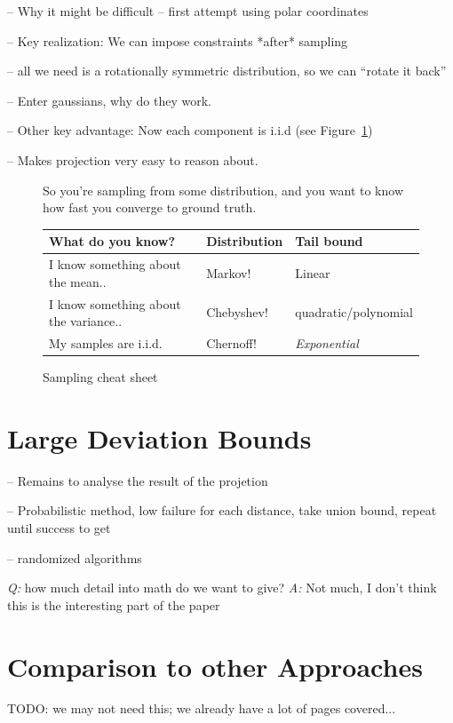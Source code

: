 \documentclass[11pt]{article}
\begin{document}
-- Why it might be difficult
-- first attempt using polar coordinates

-- Key realization: We can impose constraints *after* sampling

   -- all we need is a rotationally symmetric distribution, so we can ``rotate
   it back''

-- Enter gaussians, why do they work.

-- Other key advantage: Now each component is i.i.d (see Figure~\ref{fig:bounds})

    -- Makes projection very easy to reason about.

    \begin{figure}[H]
      So you're sampling from some distribution, and you want to know how fast
      you converge to ground truth.

      \begin{tabular}{lll}
        What do you know? & Distribution & Tail bound\\
        \hline
        I know something about the mean..  & Markov! & Linear \\
        I know something about the variance..  & Chebyshev! & quadratic/polynomial\\
        My samples are i.i.d.  & Chernoff! & \emph{Exponential}\\
        \hline
      \end{tabular}
      \caption{Sampling cheat sheet}
      \label{fig:bounds}
    \end{figure}

\section{Large Deviation Bounds}

-- Remains to analyse the result of the projetion

-- Probabilistic method, low failure for each distance, take union bound, repeat
until success to get

-- randomized algorithms

\emph{Q:} how much detail into math do we want to give?
\emph{A:} Not much, I don't think this is the interesting part of the paper


\section{Comparison to other Approaches}
TODO: we may not need this; we already have a lot of pages covered...
\end{document}
